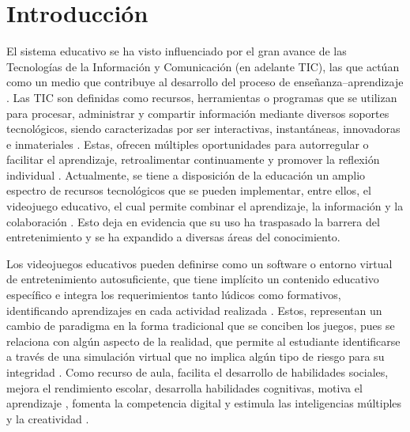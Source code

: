 \documentclass[spanish]{textolivre}
\begin{document}
\section{Introducción}\label{sec-intro}
El sistema educativo se ha visto influenciado por el gran avance de las Tecnologías de la Información y Comunicación (en adelante TIC), las que actúan como un medio que contribuye al desarrollo del proceso de enseñanza–aprendizaje \cite{martinez_soto_evaluacion_2018}. Las TIC son definidas como recursos, herramientas o programas que se utilizan para procesar, administrar y compartir información mediante diversos soportes tecnológicos, siendo caracterizadas por ser interactivas, instantáneas, innovadoras e inmateriales \cite{cervantes_cabello_incursionando_2020,recio_formacion_2016,sanchez-otero_estrategias_2019}. Estas, ofrecen múltiples oportunidades para autorregular o facilitar el aprendizaje, retroalimentar continuamente y promover la reflexión individual \cite{corral_carrillo_recursos_2016}. Actualmente, se tiene a disposición de la educación un amplio espectro de recursos tecnológicos que se pueden implementar, entre ellos, el videojuego educativo, el cual permite combinar el aprendizaje, la información y la colaboración \cite{santa_videojuego_2018}. Esto deja en evidencia que su uso ha traspasado la barrera del entretenimiento y se ha expandido a diversas áreas del conocimiento.

Los videojuegos educativos pueden definirse como un software o entorno virtual de entretenimiento autosuficiente, que tiene implícito un contenido educativo específico e integra los requerimientos tanto lúdicos como formativos, identificando aprendizajes en cada actividad realizada \cite{alvarez_serious_2007,padilla_metodologipara_2011,adell_proceso_2018}. Estos, representan un cambio de paradigma en la forma tradicional que se conciben los juegos, pues se relaciona con algún aspecto de la realidad, que permite al estudiante identificarse a través de una simulación virtual que no implica algún tipo de riesgo para su integridad \cite{urquidi_martin_juegos_2015,lopez_raventos_videojuego_2016}. Como recurso de aula, facilita el desarrollo de habilidades sociales, mejora el rendimiento escolar, desarrolla habilidades cognitivas, motiva el aprendizaje \cite{jimenez_uso_2016}, fomenta la competencia digital y estimula las inteligencias múltiples y la creatividad \cite{grande_de_prado_beneficios_2018}.
\end{document}
